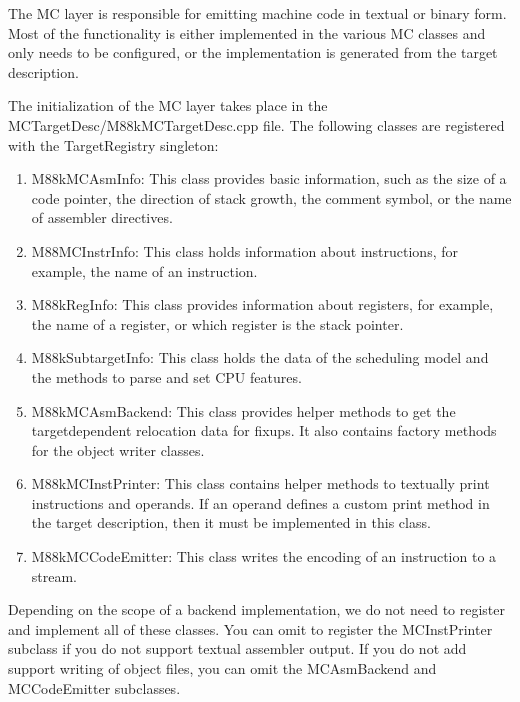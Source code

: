 The MC layer is responsible for emitting machine code in textual or binary form. Most of the functionality is either implemented in the various MC classes and only needs to be configured, or the implementation is generated from the target description.\par

The initialization of the MC layer takes place in the MCTargetDesc/M88kMCTargetDesc.cpp file. The following classes are registered with the TargetRegistry singleton:\par

\begin{enumerate}
\item M88kMCAsmInfo: This class provides basic information, such as the size of a code pointer, the direction of stack growth, the comment symbol, or the name of assembler directives.

\item M88MCInstrInfo: This class holds information about instructions, for example, the name of an instruction.

\item M88kRegInfo: This class provides information about registers, for example, the name of a register, or which register is the stack pointer.

\item M88kSubtargetInfo: This class holds the data of the scheduling model and the methods to parse and set CPU features.

\item M88kMCAsmBackend: This class provides helper methods to get the targetdependent relocation data for fixups. It also contains factory methods for the object writer classes.

\item M88kMCInstPrinter: This class contains helper methods to textually print instructions and operands. If an operand defines a custom print method in the target description, then it must be implemented in this class.

\item M88kMCCodeEmitter: This class writes the encoding of an instruction to a stream.
\end{enumerate}

Depending on the scope of a backend implementation, we do not need to register and implement all of these classes. You can omit to register the MCInstPrinter subclass if you do not support textual assembler output. If you do not add support writing of object files, you can omit the MCAsmBackend and MCCodeEmitter subclasses.\par
 
